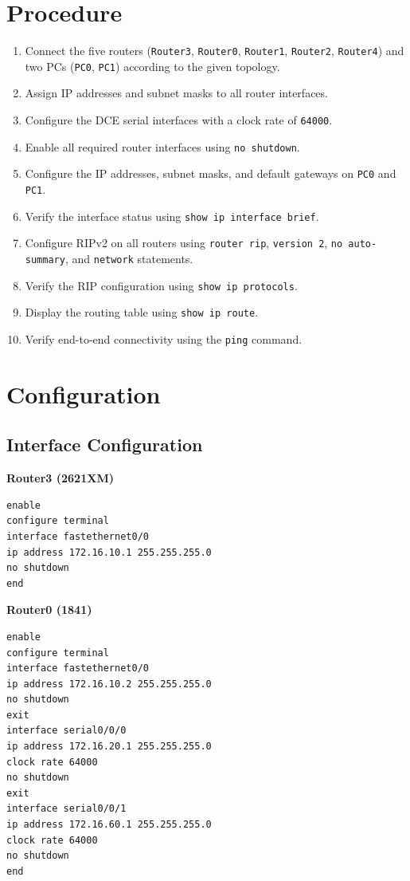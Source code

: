 \documentclass[12pt, a4paper]{report}
\begin{document}
\section*{Procedure}
\begin{enumerate}
	\item Connect the five routers (\texttt{Router3}, \texttt{Router0}, \texttt{Router1}, \texttt{Router2}, \texttt{Router4}) and two PCs (\texttt{PC0}, \texttt{PC1}) according to the given topology.
	\item Assign IP addresses and subnet masks to all router interfaces.
	\item Configure the DCE serial interfaces with a clock rate of \texttt{64000}.
	\item Enable all required router interfaces using \texttt{no shutdown}.
	\item Configure the IP addresses, subnet masks, and default gateways on \texttt{PC0} and \texttt{PC1}.
	\item Verify the interface status using \texttt{show ip interface brief}.
	\item Configure RIPv2 on all routers using \texttt{router rip}, \texttt{version 2}, \texttt{no auto-summary}, and \texttt{network} statements.
	\item Verify the RIP configuration using \texttt{show ip protocols}.
	\item Display the routing table using \texttt{show ip route}.
	\item Verify end-to-end connectivity using the \texttt{ping} command.
\end{enumerate}

\section*{Configuration}

\subsection*{Interface Configuration}
\textbf{Router3 (2621XM)}
\begin{lstlisting}
enable
configure terminal
interface fastethernet0/0
ip address 172.16.10.1 255.255.255.0
no shutdown
end
\end{lstlisting}

\textbf{Router0 (1841)}
\begin{lstlisting}
enable
configure terminal
interface fastethernet0/0
ip address 172.16.10.2 255.255.255.0
no shutdown
exit
interface serial0/0/0
ip address 172.16.20.1 255.255.255.0
clock rate 64000
no shutdown
exit
interface serial0/0/1
ip address 172.16.60.1 255.255.255.0
clock rate 64000
no shutdown
end
\end{lstlisting}
\end{document}
